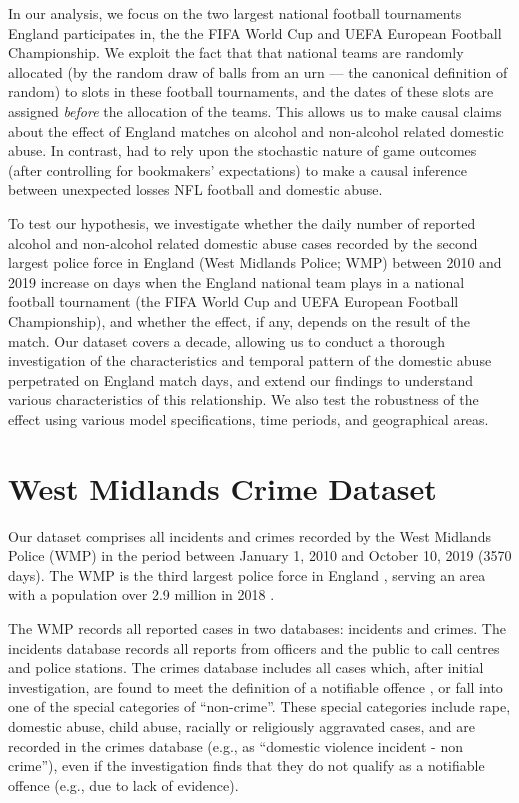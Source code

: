 \documentclass[12pt, a4paper]{article}
\begin{document}
In our analysis, we focus on the two largest national football tournaments England participates in, the the FIFA World Cup and UEFA European Football Championship. We exploit the fact that that national teams are randomly allocated (by the random draw of balls from an urn --- the canonical definition of random) to slots in these football tournaments, and the dates of these slots are assigned \emph{before} the allocation of the teams. This allows us to make causal claims about the effect of England matches on alcohol and non-alcohol related domestic abuse. In contrast,  had to rely upon the stochastic nature of game outcomes (after controlling for bookmakers' expectations) to make a causal inference between unexpected losses NFL football and domestic abuse. 

To test our hypothesis, we investigate whether the daily number of reported alcohol and non-alcohol related domestic abuse cases recorded by the second largest police force in England (West Midlands Police; WMP) between 2010 and 2019 increase on days when the England national team plays in a national football tournament (the FIFA World Cup and UEFA European Football Championship), and whether the effect, if any, depends on the result of the match. Our dataset covers a decade, allowing us to conduct a thorough investigation of the characteristics and temporal pattern of the domestic abuse perpetrated on England match days, and extend our findings to understand various characteristics of this relationship. We also test the robustness of the effect using various model specifications, time periods, and geographical areas. 



\section{West Midlands Crime Dataset}


Our dataset comprises all incidents and crimes recorded by the West Midlands Police (WMP) in the period between January 1, 2010 and October 10, 2019 (3570 days). The WMP is the third largest police force in England \cite{Homeoffice}, serving an area with a population over 2.9 million in 2018 \cite{populationfigure}. 

The WMP records all reported cases in two databases: incidents and crimes. The incidents database records all reports from officers and the public to call centres and police stations. The crimes database includes all cases which, after initial investigation, are found to meet the definition of a notifiable offence , or fall into one of the special categories of ``non-crime''. These special categories include rape, domestic abuse, child abuse, racially or religiously aggravated cases, and are recorded in the crimes database (e.g., as ``domestic violence incident - non crime''), even if the investigation finds that they do not qualify as a notifiable offence (e.g., due to lack of evidence).
 
\end{document}
